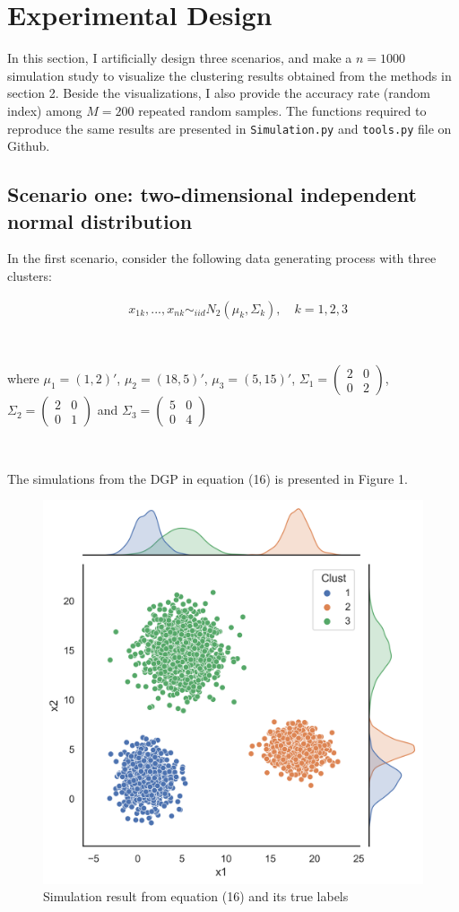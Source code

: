 \documentclass[a4paper]{article}
\begin{document}
\section{Experimental Design}
In this section, I artificially design three scenarios, and make a $n= 1000$ simulation study to visualize the clustering results obtained from the methods in section 2. Beside the visualizations, I also provide the accuracy rate (random index) among $M = 200$ repeated random samples. The functions required to reproduce the same results are presented in \texttt{Simulation.py} and \texttt{tools.py} file on Github.

\subsection{Scenario one: two-dimensional independent normal distribution}

In the first scenario, consider the following data generating process with three clusters:

\begin{align}
	& x_{1k}, ..., x_{nk} \sim_{iid} N_2 (\mu_k,  \Sigma_k), \quad k = 1, 2, 3
\end{align}

\

where $\mu_1 = (1, 2)'$, $\mu_2 = (18, 5)'$, $\mu_3 = (5, 15)'$, 
$\Sigma_1 = \left( \begin{smallmatrix} 2&0\\ 0&2 \end{smallmatrix} \right)$, $\Sigma_2 = \left( \begin{smallmatrix} 2&0\\ 0&1 \end{smallmatrix} \right)$ and $\Sigma_3 = \left( \begin{smallmatrix} 5&0\\ 0&4 \end{smallmatrix} \right)$

\

The simulations from the DGP in equation (16) is presented in Figure 1. 

\begin{figure}[h!]
  \centering
  \includegraphics[width=0.45\linewidth]{../Simu_results/sen1.png}
  \caption{Simulation result from equation (16) and its true labels}
  \label{fig:sec}
\end{figure}
\end{document}
